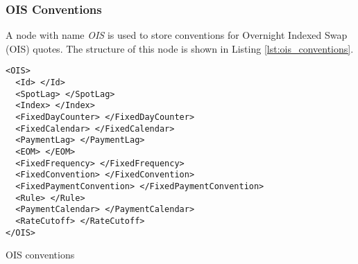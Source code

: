 \subsubsection{OIS Conventions}

A node with name \emph{OIS} is used to store conventions for Overnight Indexed Swap (OIS) quotes. The structure of this
node is shown in Listing \ref{lst:ois_conventions}.

\begin{listing}[H]
\begin{verbatim}
<OIS>
  <Id> </Id>
  <SpotLag> </SpotLag>
  <Index> </Index>
  <FixedDayCounter> </FixedDayCounter>
  <FixedCalendar> </FixedCalendar>
  <PaymentLag> </PaymentLag>
  <EOM> </EOM>
  <FixedFrequency> </FixedFrequency>
  <FixedConvention> </FixedConvention>
  <FixedPaymentConvention> </FixedPaymentConvention>
  <Rule> </Rule>
  <PaymentCalendar> </PaymentCalendar>
  <RateCutoff> </RateCutoff>
</OIS>
\end{verbatim}
\caption{OIS conventions}
\label{lst:ois_conventions}
\end{listing}


